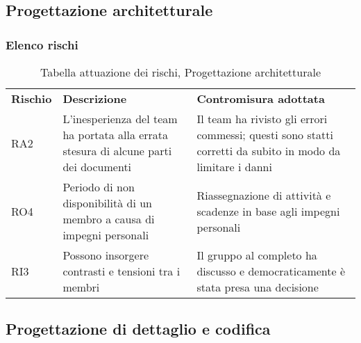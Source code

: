 \newpage
\subsection{Progettazione architetturale}
\subsubsection{Elenco rischi}
\begin{table}[h]
\caption{Tabella attuazione dei rischi, Progettazione architetturale}
\begin{center}
\begin{tabular}{p{2cm}p{6cm}p{6cm}}
\textbf{Rischio} & \textbf{Descrizione}                                                                                                        & \textbf{Contromisura adottata}                                                                                                                                                   \\
RA2              & L'inesperienza del team ha portata alla errata stesura di alcune parti dei documenti & Il team ha rivisto gli errori commessi; questi sono statti corretti da subito in modo da limitare i danni
\\
RO4 & Periodo di non disponibilità di un membro a causa di impegni personali & Riassegnazione di attività e scadenze in base agli impegni personali
\\
RI3 & Possono insorgere contrasti e tensioni tra i membri & Il gruppo al completo ha discusso e democraticamente è stata presa una decisione
\end{tabular}
\end{center}
\end{table}
\newpage
\subsection{Progettazione di dettaglio e codifica}
